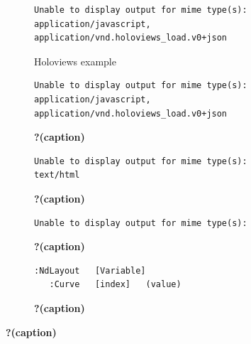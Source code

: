 \documentclass[
  letterpaper,
  DIV=11,
  numbers=noendperiod]{scrreport}
\begin{document}
\begin{figure}

{\centering 

\begin{figure}

{\centering 

\begin{verbatim}
Unable to display output for mime type(s): application/javascript, application/vnd.holoviews_load.v0+json
\end{verbatim}

}

\caption{Holoviews example}

\end{figure}

\begin{figure}

{\centering 

\begin{verbatim}
Unable to display output for mime type(s): application/javascript, application/vnd.holoviews_load.v0+json
\end{verbatim}

}

\caption{\textbf{?(caption)}}

\end{figure}

\begin{figure}

{\centering 

\begin{verbatim}
Unable to display output for mime type(s): text/html
\end{verbatim}

}

\caption{\textbf{?(caption)}}

\end{figure}

\begin{figure}

{\centering 

\begin{verbatim}
Unable to display output for mime type(s): 
\end{verbatim}

}

\caption{\textbf{?(caption)}}

\end{figure}

\begin{figure}

{\centering 

\begin{verbatim}
:NdLayout   [Variable]
   :Curve   [index]   (value)
\end{verbatim}

}

\caption{\textbf{?(caption)}}

\end{figure}

}

\caption{\label{fig-plot}\textbf{?(caption)}}

\end{figure}
\end{document}
